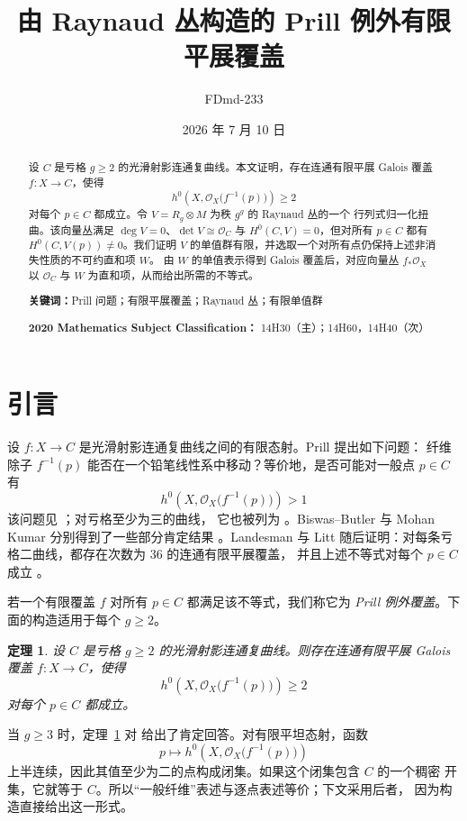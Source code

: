 \documentclass[UTF8,10pt,a4paper]{ctexart}
\title{由 Raynaud 丛构造的 Prill 例外有限平展覆盖}
\author{FDmd-233}
\date{2026 年 7 月 10 日}
\newtheorem{theorem}{定理}[section]
\theoremstyle{remark}
\newcommand{\OO}{\mathcal{O}}
\newcommand{\tens}{\otimes}
\begin{document}
\maketitle

\begin{abstract}
设 $C$ 是亏格 $g\geq2$ 的光滑射影连通复曲线。本文证明，存在连通有限平展
Galois 覆盖 $f\colon X\to C$，使得
\[
  h^0\!\left(X,\OO_X\bigl(f^{-1}(p)\bigr)\right)\geq2
\]
对每个 $p\in C$ 都成立。令 $V=R_g\tens M$ 为秩 $g^g$ 的 Raynaud 丛的一个
行列式归一化扭曲。该向量丛满足 $\deg V=0$、$\det V\cong\OO_C$ 与
$H^0(C,V)=0$，但对所有 $p\in C$ 都有 $H^0(C,V(p))\neq0$。我们证明 $V$
的单值群有限，并选取一个对所有点仍保持上述非消失性质的不可约直和项 $W$。
由 $W$ 的单值表示得到 Galois 覆盖后，对应向量丛 $f_*\OO_X$ 以 $\OO_C$ 与
$W$ 为直和项，从而给出所需的不等式。

\medskip
\noindent\textbf{关键词：}Prill 问题；有限平展覆盖；Raynaud 丛；有限单值群

\noindent\textbf{2020 Mathematics Subject Classification：}
14H30（主）；14H60，14H40（次）
\end{abstract}

\section{引言}

设 $f\colon X\to C$ 是光滑射影连通复曲线之间的有限态射。Prill 提出如下问题：
纤维除子 $f^{-1}(p)$ 能否在一个铅笔线性系中移动？等价地，是否可能对一般点
$p\in C$ 有
\[
  h^0\!\left(X,\OO_X\bigl(f^{-1}(p)\bigr)\right)>1
\]
该问题见 \cite[Chapter~VI, Exercise~D]{ACGH}；对亏格至少为三的曲线，
它也被列为 \cite[Problem~14]{LittProblem14}。Biswas--Butler 与 Mohan Kumar
分别得到了一些部分肯定结果 \cite{BiswasButler,MohanKumar}。Landesman 与
Litt 随后证明：对每条亏格二曲线，都存在次数为 $36$ 的连通有限平展覆盖，
并且上述不等式对每个 $p\in C$ 成立 \cite{LandesmanLitt}。

若一个有限覆盖 $f$ 对所有 $p\in C$ 都满足该不等式，我们称它为
\emph{Prill 例外覆盖}。下面的构造适用于每个 $g\geq2$。

\begin{theorem}\label{thm:main-zh}
设 $C$ 是亏格 $g\geq2$ 的光滑射影连通复曲线。则存在连通有限平展 Galois
覆盖 $f\colon X\to C$，使得
\[
  h^0\!\left(X,\OO_X\bigl(f^{-1}(p)\bigr)\right)\geq2
\]
对每个 $p\in C$ 都成立。
\end{theorem}

当 $g\geq3$ 时，定理~\ref{thm:main-zh} 对
\cite[Problem~14]{LittProblem14} 给出了肯定回答。对有限平坦态射，函数
\[
  p\longmapsto h^0\!\left(X,\OO_X\bigl(f^{-1}(p)\bigr)\right)
\]
上半连续，因此其值至少为二的点构成闭集。如果这个闭集包含 $C$ 的一个稠密
开集，它就等于 $C$。所以“一般纤维”表述与逐点表述等价；下文采用后者，
因为构造直接给出这一形式。
\end{document}
